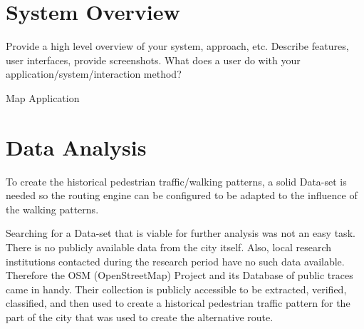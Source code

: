 \section{System Overview}

Provide a high level overview of your system, approach, etc. 
Describe features, user interfaces, provide screenshots.
What does a user do with your application/system/interaction method?

Map Application

\section{Data Analysis}

To create the historical pedestrian traffic/walking patterns, a solid Data-set is needed so the routing engine can be configured to be adapted to the influence of the walking patterns. 

Searching for a Data-set that is viable for further analysis was not an easy task. There is no publicly available data from the city itself. Also, local research institutions contacted during the research period have no such data available. Therefore the OSM (OpenStreetMap) Project and its Database of public traces came in handy. Their collection is publicly accessible to be extracted, verified, classified, and then used to create a historical pedestrian traffic pattern for the part of the city that was used to create the alternative route.

